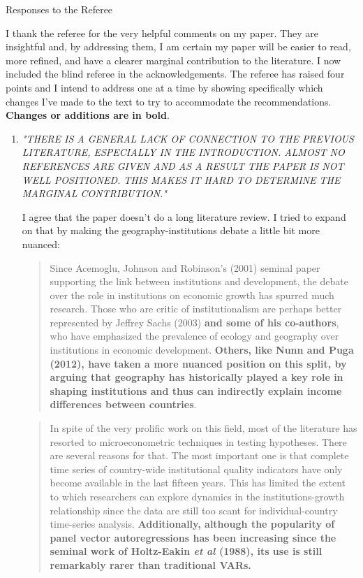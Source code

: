 \documentclass{article}
\begin{document}
Responses to the Referee

\vspace{12pt}

I thank the referee for the very helpful comments on my paper. They are insightful and, by addressing them, I am certain my paper will be easier to read, more refined, and have a clearer marginal contribution to the literature. I now included the blind referee in the acknowledgements. The referee has raised four points and I intend to address one at a time by showing specifically which changes I've made to the text to try to accommodate the recommendations. \textbf{Changes or additions are in bold}.

\begin{enumerate}
    \item \textit{"THERE IS A GENERAL LACK OF CONNECTION TO THE PREVIOUS LITERATURE, ESPECIALLY IN THE INTRODUCTION. ALMOST NO REFERENCES ARE GIVEN AND AS A RESULT THE PAPER IS NOT WELL POSITIONED. THIS MAKES IT HARD TO DETERMINE THE MARGINAL CONTRIBUTION."}
    
    I agree that the paper doesn't do a long literature review. I tried to expand on that by making the geography-institutions debate a little bit more nuanced:
    
    \begin{quote}
        Since Acemoglu, Johnson and Robinson's (2001) seminal paper supporting the link between institutions and development, the debate over the role in institutions on economic growth has spurred much research. Those who are critic of institutionalism are perhaps better represented by Jeffrey Sachs (2003) \textbf{and some of his co-authors}, who have emphasized the prevalence of ecology and geography over institutions in economic development. \textbf{Others, like Nunn and Puga (2012), have taken a more nuanced position on this split, by arguing that geography has historically played a key role in shaping institutions and thus can indirectly explain income differences between countries}.
    \end{quote}
    \begin{quote}
        In spite of the very prolific work on this field, most of the literature has resorted to microeconometric techniques in testing hypotheses. There are several reasons for that. The most important one is that complete time series of country-wide institutional quality indicators have only become available in the last fifteen years. This has limited the extent to which researchers can explore dynamics in the institutions-growth relationship since the data are still too scant for individual-country time-series analysis. \textbf{Additionally, although the popularity of  panel vector autoregressions has been increasing since the seminal work of Holtz-Eakin \textit{et al} (1988), its use is still remarkably rarer than traditional VARs.}
    \end{quote}
    

\end{enumerate}
\end{document}
